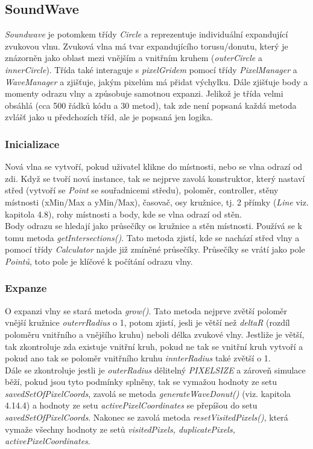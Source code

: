\subsection{SoundWave}
\textit{Soundwave} je potomkem třídy \textit{Circle} a reprezentuje individuální expandující zvukovou vlnu. Zvuková vlna má tvar expandujícího torusu/donutu, který je znázorněn jako oblast mezi vnějším a vnitřním kruhem (\textit{outerCircle} a \textit{innerCircle}). Třída také interaguje s \textit{pixelGridem} pomocí třídy \textit{PixelManager} a \textit{WaveManager} a zjišťuje, jakým pixelům má přidat výchylku. Dále zjišťuje body a momenty odrazu vlny a způsobuje samotnou expanzi. Jelikož je třída velmi obsáhlá (cca 500 řádků kódu a 30 metod), tak zde není popsaná každá metoda zvlášť jako u předchozích tříd, ale je popsaná jen logika.  \\



\subsubsection{Inicializace}
Nová vlna se vytvoří, pokud uživatel klikne do místnosti, nebo se vlna odrazí od zdi. Když se tvoří nová instance, tak se nejprve zavolá konstruktor, který nastaví střed (vytvoří se \textit{Point} se souřadnicemi středu), poloměr, controller, stěny místnosti (xMin/Max a yMin/Max), časovač, osy kružnice, tj. 2 přímky (\textit{Line} viz. kapitola 4.8), rohy místnosti a body, kde se vlna odrazí od stěn.\\
Body odrazu se hledají jako průsečíky os kružnice a stěn místnosti. Používá se k tomu metoda \textit{getIntersections()}. Tato metoda zjistí, kde se nachází střed vlny a pomocí třídy \textit{Calculator} najde již zmíněné průsečíky. Průsečíky se vrátí jako pole \textit{Pointů}, toto pole je klíčové k počítání odrazu vlny. 



\subsubsection{Expanze}
O expanzi vlny se stará metoda \textit{grow()}. Tato metoda nejprve zvětší poloměr vnější kružnice \textit{outerrRadius} o 1, potom zjistí, jesli je větší než \textit{deltaR} (rozdíl poloměru vnitřního a vnějšího kruhu) neboli délka zvukové vlny. Jestliže je větší, tak zkontroluje zda existuje vnitřní kruh, pokud ne tak se vnitřní kruh vytvoří a pokud ano tak se poloměr vnitřního kruhu \textit{innterRadius} také zvětší o 1.\\
Dále se zkontroluje jestli je \textit{outerRadius} dělitelný \textit{PIXELSIZE} a zároveň simulace běží, pokud jsou tyto podmínky splněny, tak se vymažou hodnoty ze setu \textit{savedSetOfPixelCoords}, zavolá se metoda \textit{generateWaveDonut()} (viz. kapitola 4.14.4) a hodnoty ze setu \textit{activePixelCoordinates} se přepíšou do setu \textit{savedSetOfPixelCoords}. Nakonec se zavolá metoda \textit{resetVisitedPixels()}, která vymaže všechny hodnoty ze setů 
\textit{visitedPixels, duplicatePixels, activePixelCoordinates}.

